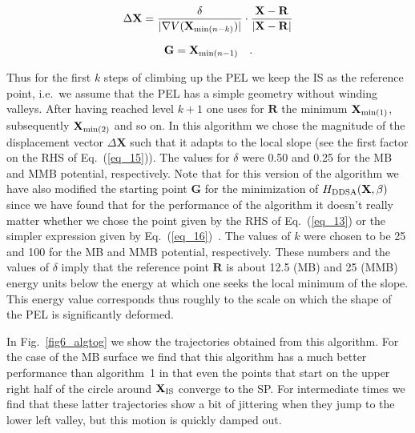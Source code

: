 \documentclass[aip,pre,twocolumn,reprint]{revtex4-1}
\begin{document}
\begin{equation}
\Delta\mathbf{X}=\frac{\delta}{|\nabla V(\mathbf{X}_{{\rm min}(n-k)}) \vert} \cdot 
\frac{\mathbf{X}-\mathbf{R}}{\vert \mathbf{X}-\mathbf{R} \vert}
\label{eq_15}
\end{equation}

\begin{equation}
\mathbf{G}= \mathbf{X}_{{\rm min}(n-1)} \quad .
\label{eq_16}
\end{equation}

\noindent
Thus for the first $k$ steps of climbing up the PEL we keep the IS
as the reference point, i.e.~we assume that the PEL has a simple
geometry without winding valleys. After having reached level $k+1$
one uses for $\mathbf{R}$ the minimum $\mathbf{X}_{{\rm min}(1)}$,
subsequently $\mathbf{X}_{{\rm min}(2)}$ and so on. In this algorithm
we chose the magnitude of the displacement vector $\Delta \mathbf{X}$
such that it adapts to the local slope (see the first factor on the RHS
of Eq.~(\ref{eq_15})). The values for $\delta$ were 0.50 and 0.25 for
the MB and MMB potential, respectively. Note that for this version of
the algorithm we have also modified the starting point $\mathbf{G}$ for
the minimization of $H_{\rm DDSA}(\mathbf{X},\beta)$ since we have
found that for the performance of the algorithm it doesn't really matter
whether we chose the point given by the RHS of Eq.~(\ref{eq_13}) or the
simpler expression given by Eq.~(\ref{eq_16})~\cite{bonfanti_phd_16}. The
values of $k$ were chosen to be 25 and 100 for the MB and MMB potential,
respectively. These numbers and the values of $\delta$ imply that the
reference point $\mathbf{R}$ is about 12.5 (MB) and 25 (MMB) energy units
below the energy at which one seeks the local minimum of the slope. This
energy value corresponds thus roughly to the scale on which the shape
of the PEL is significantly deformed.

In Fig.~\ref{fig6_algtog} we show the trajectories obtained from this
algorithm. For the case of the MB surface we find that this algorithm has
a much better performance than algorithm~1 in that even the points
that start on the upper right half of the circle around $\mathbf{X}_{\rm
IS}$ converge to the SP. For intermediate times we find that these latter
trajectories show a bit of jittering when they jump to the lower left
valley, but this motion is quickly damped out.
\end{document}
